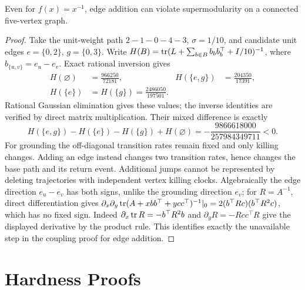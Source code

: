 \begin{proposition}\label{prop:edge}
Even for $f(x)=x^{-1}$, edge addition can violate supermodularity on a
connected five-vertex graph.
\end{proposition}
\begin{proof}
Take the unit-weight path $2-1-0-4-3$, $\sigma=1/10$, and candidate
unit edges $e=\{0,2\}$, $g=\{0,3\}$. Write
$H(B)=\operatorname{tr}(L+\sum_{b\in B}b_b b_b^\top+I/10)^{-1}$, where
$b_{\{u,v\}}=e_u-e_v$. Exact rational inversion gives
\begin{align*}
 H(\varnothing)&=\frac{966250}{72181},&
 H(\{e,g\})&=\frac{204350}{17391},\\
 H(\{e\})&=H(\{g\})=\frac{2486050}{197501}.&&
\end{align*}
Rational Gaussian elimination gives these values; the inverse
identities are verified by direct matrix multiplication.
Their mixed difference is exactly
\[
 H(\{e,g\})-H(\{e\})-H(\{g\})+H(\varnothing)
 =-\frac{9866618000}{257984349711}<0.
\]
For grounding the off-diagonal transition rates remain fixed and
only killing changes. Adding an edge instead changes two transition
rates, hence changes the base path and its return event. Additional
jumps cannot be represented by deleting trajectories with independent
vertex killing clocks. Algebraically the edge direction $e_u-e_v$
has both signs, unlike the grounding direction $e_v$; for $R=A^{-1}$,
direct differentiation gives
$\partial_x\partial_y\operatorname{tr}(A+xbb^\top+ycc^\top)^{-1}|_{0}
=2(b^\top Rc)(b^\top R^2c)$, which has no fixed sign.
Indeed $\partial_x\operatorname{tr} R=-b^\top R^2b$ and
$\partial_yR=-Rcc^\top R$ give the displayed derivative by the product
rule. This identifies exactly the unavailable step in the coupling
proof for edge addition.
\end{proof}



\section{Hardness Proofs}\label{app:hardness}

